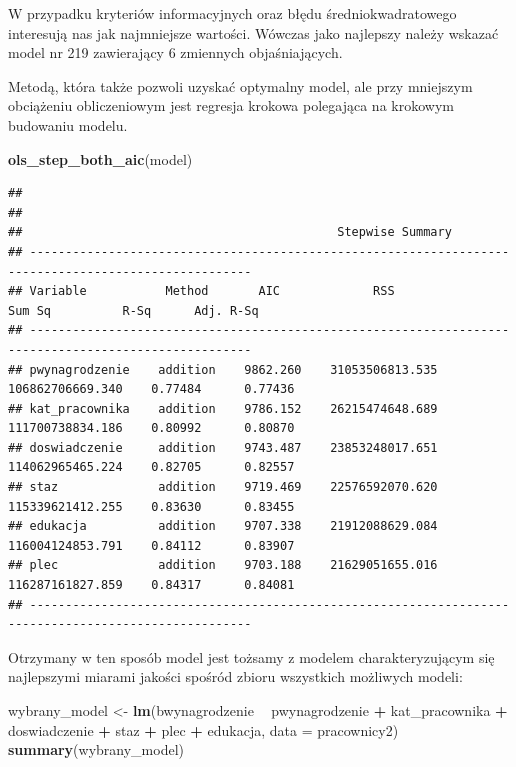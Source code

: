 \documentclass[
]{book}
\newenvironment{Shaded}{\begin{snugshade}}{\end{snugshade}}
\newcommand{\DataTypeTok}[1]{\textcolor[rgb]{0.13,0.29,0.53}{#1}}
\newcommand{\KeywordTok}[1]{\textcolor[rgb]{0.13,0.29,0.53}{\textbf{#1}}}
\newcommand{\NormalTok}[1]{#1}
\newcommand{\OperatorTok}[1]{\textcolor[rgb]{0.81,0.36,0.00}{\textbf{#1}}}
\newcommand{\StringTok}[1]{\textcolor[rgb]{0.31,0.60,0.02}{#1}}
\begin{document}
W przypadku kryteriów informacyjnych oraz błędu średniokwadratowego interesują nas jak najmniejsze wartości. Wówczas jako najlepszy należy wskazać model nr 219 zawierający 6 zmiennych objaśniających.

Metodą, która także pozwoli uzyskać optymalny model, ale przy mniejszym obciążeniu obliczeniowym jest regresja krokowa polegająca na krokowym budowaniu modelu.

\begin{Shaded}
\begin{Highlighting}[]
\KeywordTok{ols_step_both_aic}\NormalTok{(model)}
\end{Highlighting}
\end{Shaded}

\begin{verbatim}
## 
## 
##                                            Stepwise Summary                                            
## -----------------------------------------------------------------------------------------------------
## Variable           Method       AIC             RSS               Sum Sq          R-Sq      Adj. R-Sq 
## -----------------------------------------------------------------------------------------------------
## pwynagrodzenie    addition    9862.260    31053506813.535    106862706669.340    0.77484      0.77436 
## kat_pracownika    addition    9786.152    26215474648.689    111700738834.186    0.80992      0.80870 
## doswiadczenie     addition    9743.487    23853248017.651    114062965465.224    0.82705      0.82557 
## staz              addition    9719.469    22576592070.620    115339621412.255    0.83630      0.83455 
## edukacja          addition    9707.338    21912088629.084    116004124853.791    0.84112      0.83907 
## plec              addition    9703.188    21629051655.016    116287161827.859    0.84317      0.84081 
## -----------------------------------------------------------------------------------------------------
\end{verbatim}

Otrzymany w ten sposób model jest tożsamy z modelem charakteryzującym się najlepszymi miarami jakości spośród zbioru wszystkich możliwych modeli:

\begin{Shaded}
\begin{Highlighting}[]
\NormalTok{wybrany_model <-}\StringTok{ }\KeywordTok{lm}\NormalTok{(bwynagrodzenie }\OperatorTok{~}\StringTok{ }\NormalTok{pwynagrodzenie }\OperatorTok{+}\StringTok{ }\NormalTok{kat_pracownika }\OperatorTok{+}\StringTok{ }\NormalTok{doswiadczenie }\OperatorTok{+}\StringTok{ }\NormalTok{staz }\OperatorTok{+}\StringTok{ }\NormalTok{plec }\OperatorTok{+}\StringTok{ }\NormalTok{edukacja, }\DataTypeTok{data =}\NormalTok{ pracownicy2)}
\KeywordTok{summary}\NormalTok{(wybrany_model)}
\end{Highlighting}
\end{Shaded}
\end{document}
